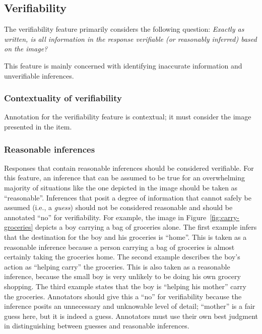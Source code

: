 \documentclass[12pt,notitlepage]{article}
\begin{document}
\subsection{Verifiability} \label{subsec:verifiability}

The verifiability feature primarily considers the following question: \textit{Exactly as written, is all information in the response verifiable (or reasonably inferred) based on the image?}

This feature is mainly concerned with identifying inaccurate information and unverifiable inferences. 

\subsubsection{Contextuality of verifiability} Annotation for the verifiability feature is contextual; it must consider the image presented in the item. 

\subsubsection{Reasonable inferences} Responses that contain reasonable inferences should be considered verifiable. For this feature, an inference that can be assumed to be true for an overwhelming majority of situations like the one depicted in the image should be taken as ``reasonable''. Inferences that posit a degree of information that cannot safely be assumed (i.e., a \textit{guess}) should not be considered reasonable and should be annotated ``no'' for verifiability. For example, the image in Figure~\ref{fig:carry-groceries} depicts a boy carrying a bag of groceries alone. The first example infers that the destination for the boy and his groceries is ``home''. This is taken as a reasonable inference because a person carrying a bag of groceries is almost certainly taking the groceries home. The second example describes the boy's action as ``helping carry'' the groceries. This is also taken as a reasonable inference, because the small boy is very unlikely to be doing his own grocery shopping. The third example states that the boy is ``helping his mother'' carry the groceries. Annotators should give this a ``no'' for verifiability because the inference posits an unnecessary and unknowable level of detail; ``mother'' is a fair guess here, but it is indeed a guess. Annotators must use their own best judgment in distinguishing between guesses and reasonable inferences.
\end{document}
